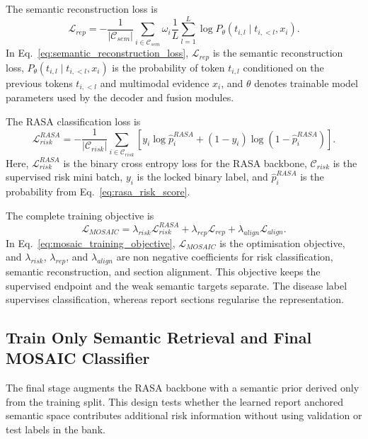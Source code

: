 The semantic reconstruction loss is
\begin{equation}
\mathcal{L}_{rep}
=
-\frac{1}{|\mathcal{C}_{sem}|}
\sum_{i\in\mathcal{C}_{sem}}
\omega_i
\frac{1}{L}
\sum_{l=1}^{L}
\log P_{\theta}(t_{i,l}\mid t_{i,<l},x_i).
\label{eq:semantic_reconstruction_loss}
\end{equation}
In Eq.~\eqref{eq:semantic_reconstruction_loss}, $\mathcal{L}_{rep}$ is the semantic reconstruction loss, $P_{\theta}(t_{i,l}\mid t_{i,<l},x_i)$ is the probability of token $t_{i,l}$ conditioned on the previous tokens $t_{i,<l}$ and multimodal evidence $x_i$, and $\theta$ denotes trainable model parameters used by the decoder and fusion modules.

The RASA classification loss is
\begin{equation}
\mathcal{L}_{risk}^{RASA}
=
-\frac{1}{|\mathcal{C}_{risk}|}
\sum_{i\in\mathcal{C}_{risk}}
\left[y_i\log\hat{p}_i^{RASA}+(1-y_i)\log(1-\hat{p}_i^{RASA})\right].
\label{eq:rasa_risk_loss}
\end{equation}
Here, $\mathcal{L}_{risk}^{RASA}$ is the binary cross entropy loss for the RASA backbone, $\mathcal{C}_{risk}$ is the supervised risk mini batch, $y_i$ is the locked binary label, and $\hat{p}_i^{RASA}$ is the probability from Eq.~\eqref{eq:rasa_risk_score}.

The complete training objective is
\begin{equation}
\mathcal{L}_{MOSAIC}
=
\lambda_{risk}\mathcal{L}_{risk}^{RASA}
+
\lambda_{rep}\mathcal{L}_{rep}
+
\lambda_{align}\mathcal{L}_{align}.
\label{eq:mosaic_training_objective}
\end{equation}
In Eq.~\eqref{eq:mosaic_training_objective}, $\mathcal{L}_{MOSAIC}$ is the optimisation objective, and $\lambda_{risk}$, $\lambda_{rep}$, and $\lambda_{align}$ are non negative coefficients for risk classification, semantic reconstruction, and section alignment. This objective keeps the supervised endpoint and the weak semantic targets separate. The disease label supervises classification, whereas report sections regularise the representation.

\subsection{Train Only Semantic Retrieval and Final MOSAIC Classifier}
\label{subsec:train_only_retrieval_final_classifier}

The final stage augments the RASA backbone with a semantic prior derived only from the training split. This design tests whether the learned report anchored semantic space contributes additional risk information without using validation or test labels in the bank.

